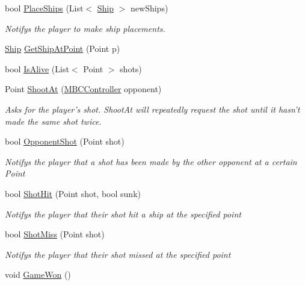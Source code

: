 \begin{DoxyCompactItemize}
bool \hyperlink{class_m_b_c_1_1_core_1_1_m_b_c_controller_a84bd5daab1a7231b8afcff6ad12e6d32}{Place\-Ships} (List$<$ \hyperlink{class_m_b_c_1_1_core_1_1_ship}{Ship} $>$ new\-Ships)
\begin{DoxyCompactList}\small\item\em Notifys the player to make ship placements.\end{DoxyCompactList}\item 
\hyperlink{class_m_b_c_1_1_core_1_1_ship}{Ship} \hyperlink{class_m_b_c_1_1_core_1_1_m_b_c_controller_acb5676b4dafbe0f17bdc887adcf796bb}{Get\-Ship\-At\-Point} (Point p)
\item 
bool \hyperlink{class_m_b_c_1_1_core_1_1_m_b_c_controller_a37d0ca59033ea9541e8030c18d4cf07b}{Is\-Alive} (List$<$ Point $>$ shots)
\item 
Point \hyperlink{class_m_b_c_1_1_core_1_1_m_b_c_controller_a14fe0f5a30b62fe1106971d8ba1196ca}{Shoot\-At} (\hyperlink{class_m_b_c_1_1_core_1_1_m_b_c_controller}{M\-B\-C\-Controller} opponent)
\begin{DoxyCompactList}\small\item\em Asks for the player's shot. Shoot\-At will repeatedly request the shot until it hasn't made the same shot twice.\end{DoxyCompactList}\item 
bool \hyperlink{class_m_b_c_1_1_core_1_1_m_b_c_controller_ac35b2fbc26ad6b6db5b9fc2156ea34b4}{Opponent\-Shot} (Point shot)
\begin{DoxyCompactList}\small\item\em Notifys the player that a shot has been made by the other opponent at a certain Point\end{DoxyCompactList}\item 
bool \hyperlink{class_m_b_c_1_1_core_1_1_m_b_c_controller_a6dbec54795763b3a601df79da9ca5c8c}{Shot\-Hit} (Point shot, bool sunk)
\begin{DoxyCompactList}\small\item\em Notifys the player that their shot hit a ship at the specified point\end{DoxyCompactList}\item 
bool \hyperlink{class_m_b_c_1_1_core_1_1_m_b_c_controller_a0868b06506eb9dc055be36508feedd14}{Shot\-Miss} (Point shot)
\begin{DoxyCompactList}\small\item\em Notifys the player that their shot missed at the specified point\end{DoxyCompactList}\item 
\hypertarget{class_m_b_c_1_1_core_1_1_m_b_c_controller_adeab23ce9e20ab8162360f5eeae1b8a2}{void \hyperlink{class_m_b_c_1_1_core_1_1_m_b_c_controller_adeab23ce9e20ab8162360f5eeae1b8a2}{Game\-Won} ()}\label{class_m_b_c_1_1_core_1_1_m_b_c_controller_adeab23ce9e20ab8162360f5eeae1b8a2}


\end{DoxyCompactItemize}
